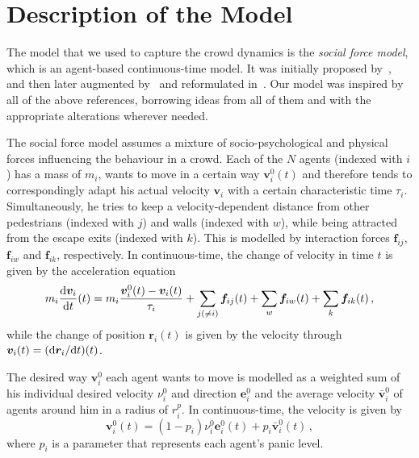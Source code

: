 \section{Description of the Model} \label{sec:4-model}
The model that we used to capture the crowd dynamics is the \emph{social force model}, which is an agent-based continuous-time model. It was initially proposed by~\citet{Helbing2000}, and then later augmented by~\citet{Zainuddin2010} and reformulated in~\citet{Wang2016}. Our model was inspired by all of the above references, borrowing ideas from all of them and with the appropriate alterations wherever needed. 

The social force model assumes a mixture of socio-psychological and physical forces influencing the behaviour in a crowd. Each of the $N$ agents (indexed with $i$) has a mass of $m_i$, wants to move in a certain way $\bm{v}_i^0(t)$ and therefore tends to correspondingly adapt his actual velocity $\bm{v}_i$ with a certain characteristic time $\tau_i$. Simultaneously, he tries to keep a velocity-dependent distance from other pedestrians (indexed with $j$) and walls (indexed with $w$), while being attracted from the escape exits (indexed with $k$). This is modelled by interaction forces $\bm{f}_{ij}$, $\bm{f}_{iw}$ and $\bm{f}_{ik}$, respectively. In continuous-time, the change of velocity in time $t$ is given by the acceleration equation
\begin{equation} \label{eq:acceleration}
	m_i \frac{\mathrm{d}\bm{v}_i}{\mathrm{d} t}(t) = m_i \frac{\bm{v}_i^0(t) -\bm{v}_i(t)}{\tau_i} + \sum_{j(\neq i)}^{}\bm{f}_{ij}(t) + \sum_{w}^{}\bm{f}_{iw}(t) + \sum_{k}^{}\bm{f}_{ik}(t) \,,
\end{equation}
while the change of position $\bm{r}_i(t)$ is given by the velocity through $\bm{v}_i(t) = (\mathrm{d}\bm{r}_i / \mathrm{d} t) (t)$.

The desired way $\bm{v}_i^0$ each agent wants to move is modelled as a weighted sum of his individual desired velocity $\nu_i^0$ and direction $\bm{e}_i^0$ and the average velocity $\bar{\bm{v}}_i^0$ of agents around him in a radius of $r_i^p$. In continuous-time, the velocity is given by
\begin{equation} \label{eq:vi}
	\bm{v}_i^0(t) = (1-p_i) \nu_i^0 \bm{e}_i^0(t) + p_i \bar{\bm{v}}_i^0(t) \,,
\end{equation}
where $p_i$ is a parameter that represents each agent's panic level.

